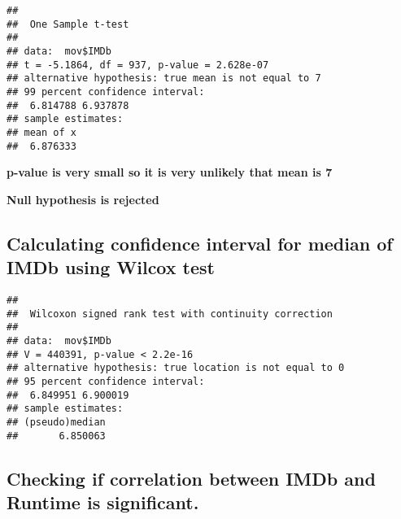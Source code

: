 \documentclass[
]{article}
\newenvironment{Shaded}{\begin{snugshade}}{\end{snugshade}}
\newcommand{\AttributeTok}[1]{\textcolor[rgb]{0.77,0.63,0.00}{#1}}
\newcommand{\ConstantTok}[1]{\textcolor[rgb]{0.00,0.00,0.00}{#1}}
\newcommand{\FloatTok}[1]{\textcolor[rgb]{0.00,0.00,0.81}{#1}}
\newcommand{\FunctionTok}[1]{\textcolor[rgb]{0.00,0.00,0.00}{#1}}
\newcommand{\NormalTok}[1]{#1}
\newcommand{\SpecialCharTok}[1]{\textcolor[rgb]{0.00,0.00,0.00}{#1}}
\begin{document}
\begin{Shaded}
\end{Shaded}

\begin{verbatim}
## 
##  One Sample t-test
## 
## data:  mov$IMDb
## t = -5.1864, df = 937, p-value = 2.628e-07
## alternative hypothesis: true mean is not equal to 7
## 99 percent confidence interval:
##  6.814788 6.937878
## sample estimates:
## mean of x 
##  6.876333
\end{verbatim}

\textbf{p-value is very small so it is very unlikely that mean is 7}

\textbf{Null hypothesis is rejected}

\hypertarget{calculating-confidence-interval-for-median-of-imdb-using-wilcox-test}{%
\subsection{Calculating confidence interval for median of IMDb using
Wilcox
test}\label{calculating-confidence-interval-for-median-of-imdb-using-wilcox-test}}

\begin{Shaded}
\end{Shaded}

\begin{verbatim}
## 
##  Wilcoxon signed rank test with continuity correction
## 
## data:  mov$IMDb
## V = 440391, p-value < 2.2e-16
## alternative hypothesis: true location is not equal to 0
## 95 percent confidence interval:
##  6.849951 6.900019
## sample estimates:
## (pseudo)median 
##       6.850063
\end{verbatim}

\hypertarget{checking-if-correlation-between-imdb-and-runtime-is-significant.}{%
\subsection{Checking if correlation between IMDb and Runtime is
significant.}\label{checking-if-correlation-between-imdb-and-runtime-is-significant.}}
\end{document}
